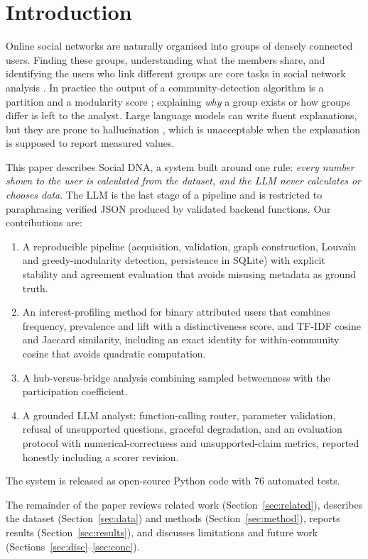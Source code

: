 \documentclass[conference]{IEEEtran}
\begin{document}
\section{Introduction}
Online social networks are naturally organised into groups of densely connected users. Finding these groups, understanding what the members share, and identifying the users who link different groups are core tasks in social network analysis \cite{fortunato2010}. In practice the output of a community-detection algorithm is a partition and a modularity score \cite{newman2006}; explaining \emph{why} a group exists or how groups differ is left to the analyst. Large language models can write fluent explanations, but they are prone to hallucination \cite{ji2023}, which is unacceptable when the explanation is supposed to report measured values.

This paper describes Social DNA, a system built around one rule: \emph{every number shown to the user is calculated from the dataset, and the LLM never calculates or chooses data}. The LLM is the last stage of a pipeline and is restricted to paraphrasing verified JSON produced by validated backend functions. Our contributions are:
\begin{enumerate}
\item A reproducible pipeline (acquisition, validation, graph construction, Louvain and greedy-modularity detection, persistence in SQLite) with explicit stability and agreement evaluation that avoids misusing metadata as ground truth.
\item An interest-profiling method for binary attributed users that combines frequency, prevalence and lift with a distinctiveness score, and TF-IDF cosine and Jaccard similarity, including an exact identity for within-community cosine that avoids quadratic computation.
\item A hub-versus-bridge analysis combining sampled betweenness with the participation coefficient.
\item A grounded LLM analyst: function-calling router, parameter validation, refusal of unsupported questions, graceful degradation, and an evaluation protocol with numerical-correctness and unsupported-claim metrics, reported honestly including a scorer revision.
\end{enumerate}
The system is released as open-source Python code with 76 automated tests.

The remainder of the paper reviews related work (Section~\ref{sec:related}), describes the dataset (Section~\ref{sec:data}) and methods (Section~\ref{sec:method}), reports results (Section~\ref{sec:results}), and discusses limitations and future work (Sections~\ref{sec:disc}--\ref{sec:conc}).
\end{document}
